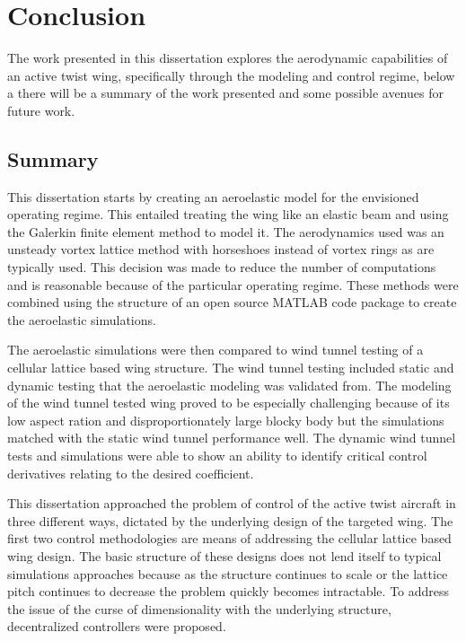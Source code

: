 \documentclass[11pt]{ucthesis}
\begin{document}
\chapter{Conclusion}
The work presented in this dissertation explores the aerodynamic capabilities of an active twist wing, specifically through the modeling and control regime, below a there will be a summary of the work presented and some possible avenues for future work.

\section{Summary}

This dissertation starts by creating an aeroelastic model for the envisioned operating regime. This entailed treating the wing like an elastic beam and using the Galerkin finite element method to model it. The aerodynamics used was an unsteady vortex lattice method with horseshoes instead of vortex rings as are typically used. This decision was made to reduce the number of computations and is reasonable because of the particular operating regime. These methods were combined using the structure of an open source MATLAB code package to create the aeroelastic simulations.

The aeroelastic simulations were then compared to wind tunnel testing of a cellular lattice based wing structure. The wind tunnel testing included static and dynamic testing that the aeroelastic modeling was validated from. The modeling of the wind tunnel tested wing proved to be especially challenging because of its low aspect ration and disproportionately large blocky body but the simulations matched with the static wind tunnel performance well. The dynamic wind tunnel tests and simulations were able to show an ability to identify critical control derivatives relating to the desired coefficient.

This dissertation approached the problem of control of the active twist aircraft in three different ways, dictated by the underlying design of the targeted wing. The first two control methodologies are means of addressing the cellular lattice based wing design. The basic structure of these designs does not lend itself to typical simulations approaches because as the structure continues to scale or the lattice pitch continues to decrease the problem quickly becomes intractable. To address the issue of the curse of dimensionality with the underlying structure, decentralized controllers were proposed.
\end{document}
